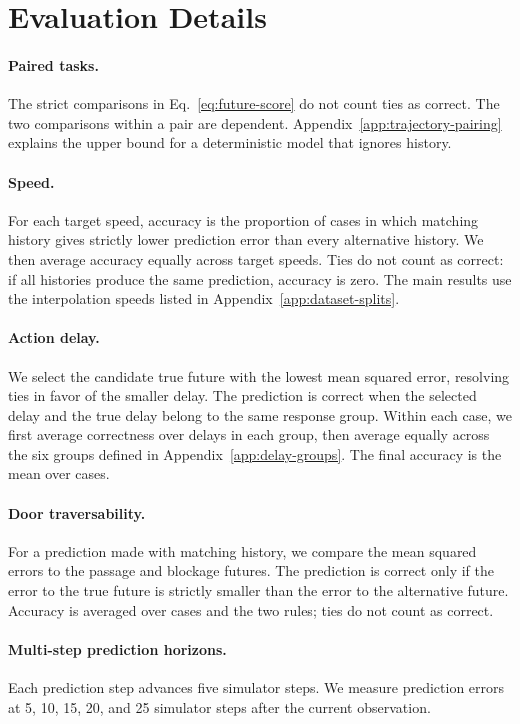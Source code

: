 \section{Evaluation Details}
\label{app:evaluation-details}

\paragraph{Paired tasks.}
The strict comparisons in Eq.~\ref{eq:future-score} do not count ties as correct.
The two comparisons within a pair are dependent.
Appendix~\ref{app:trajectory-pairing} explains the upper bound for a deterministic model that ignores history.

\paragraph{Speed.}
For each target speed, accuracy is the proportion of cases in which matching history gives strictly lower prediction error than every alternative history.
We then average accuracy equally across target speeds.
Ties do not count as correct: if all histories produce the same prediction, accuracy is zero.
The main results use the interpolation speeds listed in Appendix~\ref{app:dataset-splits}.

\paragraph{Action delay.}
We select the candidate true future with the lowest mean squared error, resolving ties in favor of the smaller delay.
The prediction is correct when the selected delay and the true delay belong to the same response group.
Within each case, we first average correctness over delays in each group, then average equally across the six groups defined in Appendix~\ref{app:delay-groups}.
The final accuracy is the mean over cases.

\paragraph{Door traversability.}
For a prediction made with matching history, we compare the mean squared errors to the passage and blockage futures.
The prediction is correct only if the error to the true future is strictly smaller than the error to the alternative future.
Accuracy is averaged over cases and the two rules; ties do not count as correct.

\paragraph{Multi-step prediction horizons.}
Each prediction step advances five simulator steps.
We measure prediction errors at 5, 10, 15, 20, and 25 simulator steps after the current observation.

